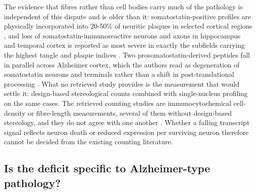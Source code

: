 \documentclass[11pt]{article}
\begin{document}
The evidence that fibres rather than cell bodies carry much of the pathology is independent of this dispute and is older than it: somatostatin-positive profiles are physically incorporated into 20-50\% of neuritic plaques in selected cortical regions \citep{Armstrong1985}, and loss of somatostatin-immunoreactive neurons and axons in hippocampus and temporal cortex is reported as most severe in exactly the subfields carrying the highest tangle and plaque indices \citep{ChanPalay1987}. Two prosomatostatin-derived peptides fall in parallel across Alzheimer cortex, which the authors read as degeneration of somatostatin neurons and terminals rather than a shift in post-translational processing \citep{Beal1986c}. What no retrieved study provides is the measurement that would settle it: design-based stereological counts combined with single-nucleus profiling on the same cases. The retrieved counting studies are immunocytochemical cell-density or fibre-length measurements, several of them without design-based stereology, and they do not agree with one another \citep{Davies1990,Li1996b}. Whether a falling transcript signal reflects neuron death or reduced expression per surviving neuron therefore cannot be decided from the existing counting literature.

\subsection{Is the deficit specific to Alzheimer-type pathology?}
\label{sec-09-disease-specificity}
\end{document}
